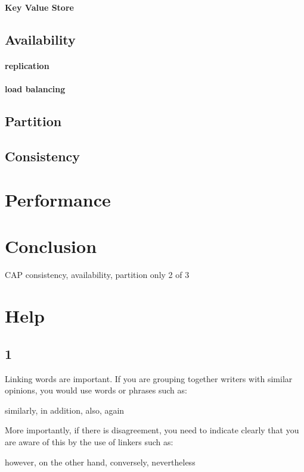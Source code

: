 \documentclass[12pt,letter]{article}
\begin{document}
\paragraph*{Key Value Store}



\subsection{Availability}
\paragraph*{replication} 
\paragraph*{load balancing} 

\subsection{Partition}

\subsection{Consistency}

\section{Performance}

\section{Conclusion}
CAP consistency, availability, partition
only 2 of 3

\section*{Help}
\subsection*{1}
Linking words are important. If you are grouping together writers with similar opinions, you would use words or phrases such as:

similarly, in addition, also, again

More importantly, if there is disagreement, you need to indicate clearly that you are aware of this by the use of linkers such as:

however, on the other hand, conversely, nevertheless
\end{document}
